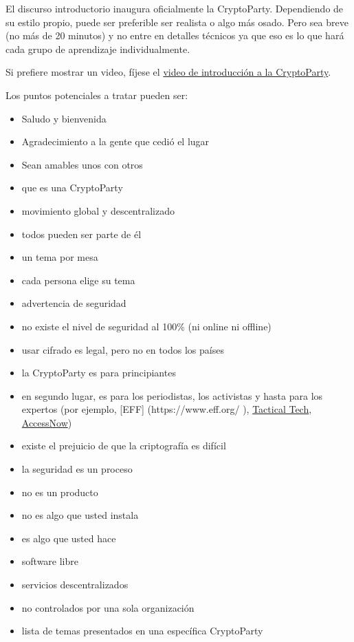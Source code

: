 \documentclass[10pt,a5paper,twoside,,]{book}
\providecommand{\tightlist}{%
  \setlength{\itemsep}{0pt}\setlength{\parskip}{0pt}}
\begin{document}
El discurso introductorio inaugura oficialmente la CryptoParty.
Dependiendo de su estilo propio, puede ser preferible ser realista o
algo más osado. Pero sea breve (no más de 20 minutos) y no entre en
detalles técnicos ya que eso es lo que hará cada grupo de aprendizaje
individualmente.

Si prefiere mostrar un video, fíjese el
\href{https://github.com/cryptoparty/video}{video de introducción a la
CryptoParty}.

Los puntos potenciales a tratar pueden ser:

\begin{itemize}
\tightlist
\item
  Saludo y bienvenida
\item
  Agradecimiento a la gente que cedió el lugar
\item
  Sean amables unos con otros
\item
  que es una CryptoParty
\item
  movimiento global y descentralizado
\item
  todos pueden ser parte de él
\item
  un tema por mesa
\item
  cada persona elige su tema
\item
  advertencia de seguridad
\item
  no existe el nivel de seguridad al 100\% (ni online ni offline)
\item
  usar cifrado es legal, pero no en todos los países
\item
  la CryptoParty es para principiantes
\item
  en segundo lugar, es para los periodistas, los activistas y hasta para
  los expertos (por ejemplo, {[}EFF{]} (https://www.eff.org/ ),
  \href{https://tacticaltech.org}{Tactical Tech},
  \href{https://www.accessnow.org/}{AccessNow})
\item
  existe el prejuicio de que la criptografía es difícil
\item
  la seguridad es un proceso
\item
  no es un producto
\item
  no es algo que usted instala
\item
  es algo que usted hace
\item
  software libre
\item
  servicios descentralizados
\item
  no controlados por una sola organización
\item
  lista de temas presentados en una específica CryptoParty
\end{itemize}
\end{document}
